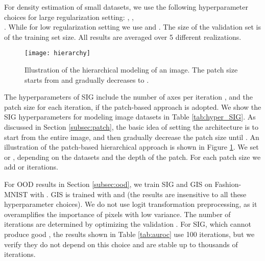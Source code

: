 \documentclass{article}
\begin{document}
For density estimation of small datasets, we use the following hyperparameter choices for large regularization setting: , ,\\ . While for low regularization setting we use  and . The size of the validation set is  of the training set size. All results are averaged over 5 different realizations.

\begin{figure}[t]
     \centering
      \texttt{[image: hierarchy]}
     \caption{Illustration of the hierarchical modeling of an  image. The patch size starts from  and gradually decreases to .}
     \label{fig:patch_hierarchy}
     \vskip -0.1in
\end{figure}

The hyperparameters of SIG include the number of axes per iteration , and the patch size for each iteration, if the patch-based approach is adopted. We show the SIG hyperparameters for modeling image datasets in Table \ref{tab:hyper_SIG}. As discussed in Section \ref{subsec:patch}, the basic idea of setting the architecture is to start from the entire image, and then gradually decrease the patch size until . An illustration of the patch-based hierarchical approach is shown in Figure \ref{fig:patch_hierarchy}. We set  or , depending on the datasets and the depth of the patch. For each patch size we add  or  iterations.

For OOD results in Section \ref{subsec:ood}, we train SIG and GIS on Fashion-MNIST with . GIS is trained with  and  (the results are insensitive to all these hyperparameter choices). We do not use logit transformation preprocessing, as it overamplifies the importance of pixels with low variance. The number of iterations are determined by optimizing the validation . For SIG, which cannot produce good , 
the results shown in Table \ref{tab:auroc} use 100 iterations, but we verify they do not depend on this choice and are stable up to thousands of iterations. 
\end{document}
